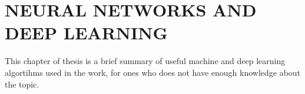 \chapter{NEURAL NETWORKS AND DEEP LEARNING}
\label{chap:dnns}
This chapter of thesis is a brief summary of useful machine and deep learning algortihms used in the work, for ones who does not have enough knowledge about the topic.
